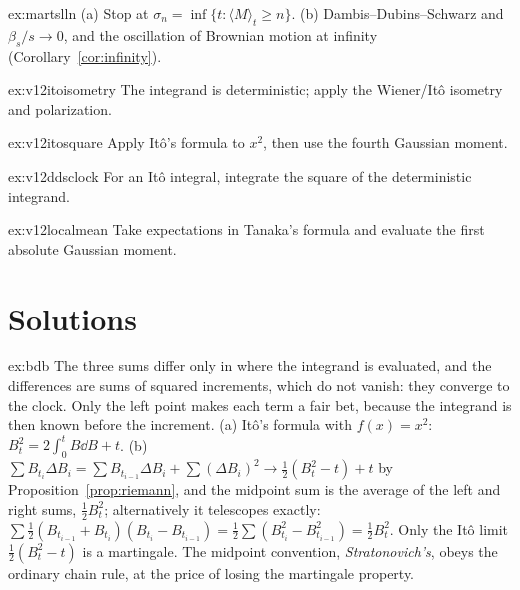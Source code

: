 \begin{hint}{ex:martslln}
(a) Stop at $\sigma_n=\inf\{t:\langle M\rangle_t\ge n\}$. (b) Dambis--Dubins--Schwarz and $\beta_s/s\to0$, and the oscillation of Brownian motion at infinity (Corollary~\ref{cor:infinity}).
\end{hint}

\begin{hint}{ex:v12itoisometry}
The integrand is deterministic; apply the Wiener/Itô isometry and polarization.
\end{hint}

\begin{hint}{ex:v12itosquare}
Apply Itô's formula to $x^2$, then use the fourth Gaussian moment.
\end{hint}

\begin{hint}{ex:v12ddsclock}
For an Itô integral, integrate the square of the deterministic integrand.
\end{hint}

\begin{hint}{ex:v12localmean}
Take expectations in Tanaka's formula and evaluate the first absolute Gaussian moment.
\end{hint}

\section{Solutions}

\begin{solution}{ex:bdb}
\idea The three sums differ only in where the integrand is evaluated, and the differences are sums of squared increments, which do not vanish: they converge to the clock. Only the left point makes each term a
fair bet, because the integrand is then known before the increment.
\writeup (a) It\^o's formula with $f(x)=x^2$: $B_t^2=2\int_0^tB\dd B+t$. (b) $\sum B_{t_i}\Delta B_i=\sum B_{t_{i-1}}\Delta B_i+\sum(\Delta B_i)^2\to\frac12(B_t^2-t)+t$ by Proposition~\ref{prop:riemann}, and the midpoint sum is the
average of the left and right sums, $\frac12B_t^2$; alternatively it telescopes exactly: $\sum\frac12(B_{t_{i-1}}+B_{t_i})(B_{t_i}-B_{t_{i-1}})=\frac12\sum(B_{t_i}^2-B_{t_{i-1}}^2)=\frac12B_t^2$. Only the It\^o limit $\frac12(B_t^2-t)$ is a
martingale. The midpoint convention, \emph{Stratonovich's}, obeys the ordinary chain rule, at the price of losing the martingale property.
\end{solution}

